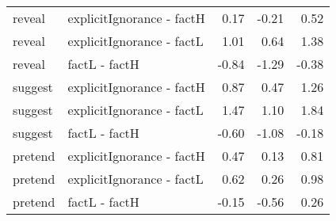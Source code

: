 \begin{longtable}{llrrr}
  reveal & explicitIgnorance - factH & 0.17 & -0.21 & 0.52 \\ 
  reveal & explicitIgnorance - factL & 1.01 & 0.64 & 1.38 \\ 
  reveal & factL - factH & -0.84 & -1.29 & -0.38 \\ 
  suggest & explicitIgnorance - factH & 0.87 & 0.47 & 1.26 \\ 
  suggest & explicitIgnorance - factL & 1.47 & 1.10 & 1.84 \\ 
  suggest & factL - factH & -0.60 & -1.08 & -0.18 \\ 
  pretend & explicitIgnorance - factH & 0.47 & 0.13 & 0.81 \\ 
  pretend & explicitIgnorance - factL & 0.62 & 0.26 & 0.98 \\ 
  pretend & factL - factH & -0.15 & -0.56 & 0.26 \\ 
  \end{longtable}

